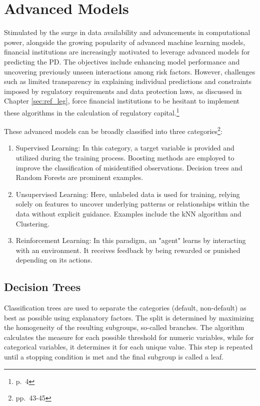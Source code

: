 \chapter{Advanced Models}
\label{ch:AM}
Stimulated by the surge in data availability and advancements in computational power, alongside the growing popularity of advanced machine learning models, financial institutions are increasingly motivated to leverage advanced models for predicting the \acl{PD}. The objectives include enhancing model performance and uncovering previously unseen interactions among risk factors. However, challenges such as limited transparency in explaining individual predictions and constraints imposed by regulatory requirements and data protection laws, as discussed in Chapter \ref{sec:ref_leg}, force financial institutions to be hesitant to implement these algorithms in the calculation of regulatory capital.\footnote{\cite{EBA:2023} p.~4}

These advanced models can be broadly classified into three categories\footnote{\cite{Roberts2022} pp.~43-45}:

\begin{enumerate}
  \item Supervised Learning: In this category, a target variable is provided and utilized during the training process. Boosting methods are employed to improve the classification of misidentified observations. Decision trees and Random Forests are prominent examples.
\item Unsupervised Learning: Here, unlabeled data is used for training, relying solely on features to uncover underlying patterns or relationships within the data without explicit guidance. Examples include the kNN algorithm and Clustering.
\item Reinforcement Learning: In this paradigm, an "agent" learns by interacting with an environment. It receives feedback by being rewarded or punished depending on its actions. 
\end{enumerate}

\section{Decision Trees}
\label{sec:dectrees}
Classification trees are used to separate the categories (default, non-default) as best as possible using explanatory factors. The split is determined by maximizing the homogeneity of the resulting subgroups, so-called branches. The algorithm calculates the measure for each possible threshold for numeric variables, while for categorical variables, it determines it for each unique value. This step is repeated until a stopping condition is met and the final subgroup is called a leaf. 

